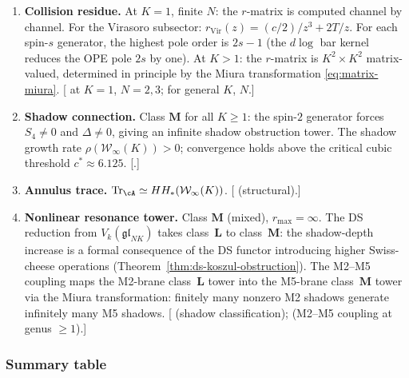 \begin{conjecture}
\begin{enumerate}[label=\textup{(\roman*)},nosep]
\item \textbf{Collision residue.}
 At $K = 1$, finite $N$: the $r$-matrix is computed channel
 by channel. For the Virasoro subsector:
 $r_{\mathrm{Vir}}(z) = (c/2)/z^3 + 2T/z$.
 For each spin-$s$ generator, the highest pole order is $2s - 1$
 (the $d\log$ bar kernel reduces the OPE pole $2s$ by one). At $K > 1$: the
 $r$-matrix is $K^2 \times K^2$ matrix-valued, determined in
 principle by the Miura transformation
 \eqref{eq:matrix-miura}.
 \textup{[\ClaimStatusProvedHere{} at $K = 1$, $N = 2,3$;
 \ClaimStatusConjectured{} for general $K$, $N$.]}

\item \textbf{Shadow connection.}
 Class $\mathbf{M}$ for all $K \ge 1$:
 the spin-$2$ generator forces
 $S_4 \ne 0$ and $\Delta \ne 0$, giving an infinite shadow obstruction tower.
 The shadow growth rate $\rho(\mathcal{W}_\infty(K)) > 0$;
 convergence holds above the critical cubic threshold
 $c^* \approx 6.125$.
 \textup{[\ClaimStatusProvedHere.]}

\item \textbf{Annulus trace.}
 $\mathrm{Tr}_\cA \simeq HH_*(\mathcal{W}_\infty(K))$.
 \textup{[\ClaimStatusProvedHere{} (structural).]}

\item \textbf{Nonlinear resonance tower.}
 Class $\mathbf{M}$ (mixed), $r_{\max} = \infty$.
 The DS reduction from $V_k(\mathfrak{gl}_{NK})$ takes
 class~$\mathbf{L}$ to class~$\mathbf{M}$: the shadow-depth
 increase is a formal consequence of the DS functor
 introducing higher Swiss-cheese operations
 \textup{(}Theorem~\textup{\ref{thm:ds-koszul-obstruction}}\textup{)}.
 The M2--M5 coupling maps the M2-brane
 class~$\mathbf{L}$ tower into the M5-brane
 class~$\mathbf{M}$ tower via the Miura transformation:
 finitely many nonzero M2 shadows generate infinitely many
 M5 shadows.
 \textup{[\ClaimStatusProvedHere{} (shadow classification);
 \ClaimStatusConjectured{} (M2--M5 coupling at genus $\ge 1$).]}
\end{enumerate}
\end{conjecture}


\subsubsection{Summary table}
\label{subsubsec:platonic-summary-table}

